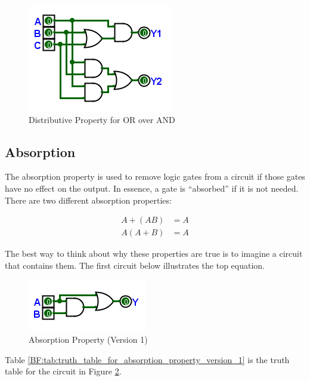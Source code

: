 \begin{figure}[H]
	\centering
	\includegraphics[width=\maxwidth{.95\linewidth}]{gfx/04_24}
	\caption{Distributive Property for OR over AND}
	\label{fig:04_24}
\end{figure}

\subsection{Absorption}
\label{BF:subsec:absorption_property}

The absorption property is used to remove logic gates from a circuit if those gates have no effect on the output. In essence, a gate is ``absorbed'' if it is not needed. There are two different absorption properties:

\begin{align}
  \label{BF:eq:absorption}
  A + (AB) &= A \\
  \nonumber
  A(A + B) &= A
\end{align}

The best way to think about why these properties are true is to imagine a circuit that contains them. The first circuit below illustrates the top equation. 

\begin{figure}[H]
	\centering
	\includegraphics[width=\maxwidth{.95\linewidth}]{gfx/04_25}
	\caption{Absorption Property (Version 1)}
	\label{fig:04_25}
\end{figure}

Table \ref{BF:tab:truth_table_for_absorption_property_version_1} is the truth table for the circuit in Figure \ref{fig:04_25}.

